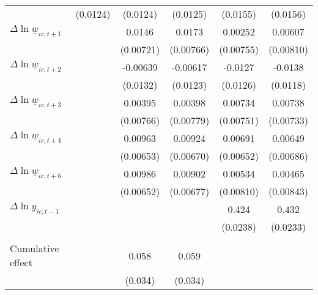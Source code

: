 {\begin{tabular}{l*{5}{c}}
          & (0.0124)         & (0.0124)         & (0.0125)         & (0.0155)         & (0.0156)         \\
[1em]
$\Delta \ln \underline{w}_{ic,t+1}$&                  &   0.0146\sym{*}  &   0.0173\sym{**} &  0.00252         &  0.00607         \\
          &                  &(0.00721)         &(0.00766)         &(0.00755)         &(0.00810)         \\
[1em]
$\Delta \ln \underline{w}_{ic,t+2}$&                  & -0.00639         & -0.00617         &  -0.0127         &  -0.0138         \\
          &                  & (0.0132)         & (0.0123)         & (0.0126)         & (0.0118)         \\
[1em]
$\Delta \ln \underline{w}_{ic,t+3}$&                  &  0.00395         &  0.00398         &  0.00734         &  0.00738         \\
          &                  &(0.00766)         &(0.00779)         &(0.00751)         &(0.00733)         \\
[1em]
$\Delta \ln \underline{w}_{ic,t+4}$&                  &  0.00963         &  0.00924         &  0.00691         &  0.00649         \\
          &                  &(0.00653)         &(0.00670)         &(0.00652)         &(0.00686)         \\
[1em]
$\Delta \ln \underline{w}_{ic,t+5}$&                  &  0.00986         &  0.00902         &  0.00534         &  0.00465         \\
          &                  &(0.00652)         &(0.00677)         &(0.00810)         &(0.00843)         \\
[1em]
$\Delta \ln y_{ic,t-1}$&                  &                  &                  &    0.424\sym{***}&    0.432\sym{***}\\
          &                  &                  &                  & (0.0238)         & (0.0233)         \\
\hline
\vspace{-2mm}&                  &                  &                  &                  &                  \\
Cumulative effect&                  &0.058\sym{*}         &0.059\sym{*}         &                  &                  \\
          &                  &  (0.034)         &  (0.034)         &                  &                  \\

\end{tabular}}
